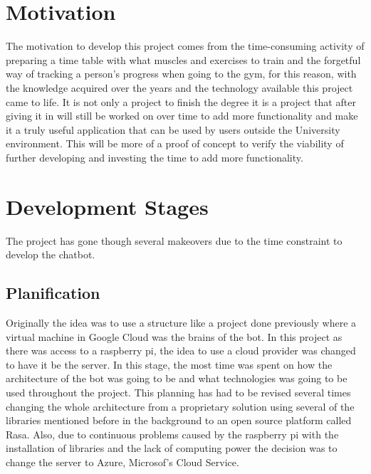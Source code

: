 \section{Motivation}\label{sec:chap1_moti}
The motivation to develop this project comes from the time-consuming activity of preparing a time table with what muscles and exercises to train and the forgetful way of tracking a person’s progress when going to the gym, for this reason, with the knowledge acquired over the years and the technology available this project came to life. It is not only a project to finish the degree it is a project that after giving it in will still be worked on over time to add more functionality and make it a truly useful application that can be used by users outside the University environment. This will be more of a proof of concept to verify the viability of further developing and investing the time to add more functionality.

\section{Development Stages}\label{sec:chap1_dev-stag}
The project has gone though several makeovers due to the time constraint to develop the chatbot. 
\subsection{Planification}\label{sec:chap1_plan}
Originally the idea was to use a structure like a project done previously where a virtual machine in Google Cloud was the brains of the bot. In this project as there was access to a raspberry pi, the idea to use a cloud provider was changed to have it be the server. 
In this stage, the most time was spent on how the architecture of the bot was going to be and what technologies was going to be used throughout the project. This planning has had to be revised several times changing the whole architecture from a proprietary solution using several of the libraries mentioned before in the background to an open source platform called Rasa. Also, due to continuous problems caused by the raspberry pi with the installation of libraries and the lack of computing power the decision was to change the server to Azure, Microsof’s Cloud Service.
